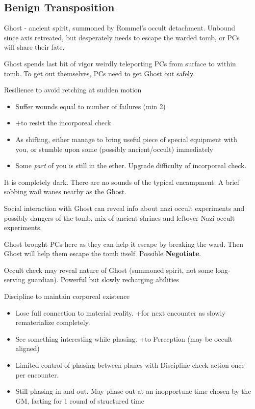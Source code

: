 \documentclass{book}
\newcommand{\df}{\DifficultyDie}
\newcommand{\stb}{\SetbackDie}
\newcommand{\ch}{\ChallengeDie}
\newcommand{\bbb}{\BoostDie}
\begin{document}
\begin{multicols}{2}
\section{Benign Transposition}

Ghost - ancient spirit, summoned by Rommel's occult detachment.  Unbound since axis retreated, but desperately needs to escape the warded tomb, or PCs will share their fate.

Ghost spends last bit of vigor weirdly teleporting PCs from surface to within tomb.  To get out themselves, PCs need to get Ghost out safely.

\df\df\df Resilience to avoid retching at sudden motion
    \begin{itemize}
        \item \Failure Suffer wounds equal to number of failures (min 2)
        \item \Advantage +\bbb to resist the incorporeal check
        \item \Triumph As shifting, either manage to bring useful piece of special equipment with you, or stumble upon some (possibly ancient/occult) immediately
        \item \Despair Some \emph{part} of you is still in the ether.  Upgrade difficulty of incorporeal check.
    \end{itemize}


It is completely dark.  There are no sounds of the typical encampment.  A brief sobbing wail wanes nearby as the Ghost.

Social interaction with Ghost can reveal info about nazi occult experiments and possibly dangers of the tomb, mix of ancient shrines and leftover Nazi occult experiments.

    Ghost brought PCs here as they can help it escape by breaking the ward.  Then Ghost will help them escape the tomb itself.  Possible \textbf{Negotiate}.

    Occult check may reveal nature of Ghost (summoned spirit, not some long-serving guardian).  Powerful but slowly recharging abilities

\ch\df Discipline to maintain corporeal existence
    \begin{itemize}
        \item \Failure Lose full connection to material reality.  +\stb for next encounter as slowly rematerialize completely.
        \item \Advantage See something interesting while phasing.  +\bbb to Perception (may be occult aligned)
        \item \Triumph Limited control of phasing between planes with \df\df\df Discipline check action once per encounter.
        \item \Despair Still phasing in and out.  May phase out at an inopportune time chosen by the GM, lasting for 1 round of structured time
    \end{itemize}


\end{multicols}
\end{document}
